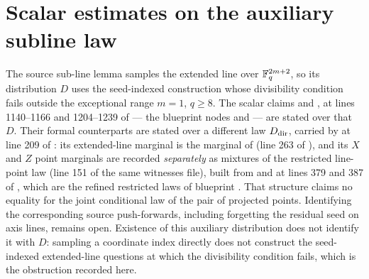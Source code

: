\documentclass[11pt]{article}
\begin{document}
\section{Scalar estimates on the auxiliary subline law}
\label{sec:auxiliary-subline-scalars}

The source sub-line lemma  samples the extended line
over $\mathbb{F}_q^{2m+2}$, so its distribution $D$ uses the seed-indexed
construction whose divisibility condition fails outside the exceptional
range $m=1$, $q\ge8$. The scalar
claims  and , at lines 1140--1166 and
1204--1239 of
 --- the
blueprint nodes  and  --- are
stated over that $D$.  Their formal counterparts are stated over a different
law $D_{\rm dir}$, carried by  at line 209 of
: its extended-line
marginal is the marginal of  (line 263 of
), and its
$X$ and $Z$ point marginals are recorded \emph{separately} as mixtures of
the restricted line-point law  (line 151 of
the same witnesses file), built from  and
 at lines 379 and 387 of
, which are the refined
restricted laws of blueprint .  That structure
claims no equality for the joint conditional law of the pair of projected
points.  Identifying the corresponding source push-forwards, including
forgetting the residual seed on axis lines, remains open.  Existence of this
auxiliary distribution does not identify it with $D$: sampling a coordinate
index directly does not construct the seed-indexed extended-line questions
at which the divisibility condition fails, which is the obstruction recorded
here.
\end{document}
